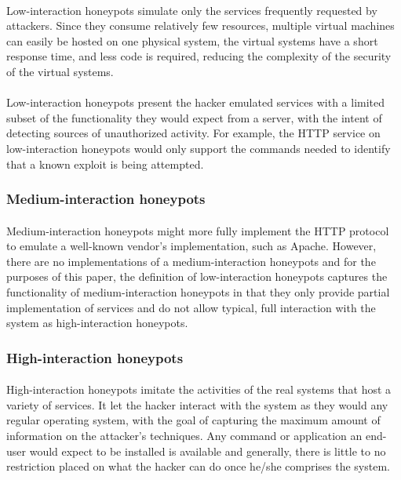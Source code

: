 \documentclass{article}
\begin{document}
\paragraph{}
Low-interaction honeypots simulate only the services frequently requested by attackers. Since they consume relatively few resources, multiple virtual machines can easily be hosted on one physical system, the virtual systems have a short response time, and less code is required, reducing the complexity of the security of the virtual systems.
\paragraph{}
Low-interaction honeypots present the hacker emulated services with a limited subset of the functionality they would expect from a server, with the intent of detecting sources of unauthorized activity. For example, the HTTP service on low-interaction honeypots would only support the commands needed to identify that a known exploit is being attempted.

\subsubsection{Medium-interaction honeypots}
\paragraph{}
Medium-interaction honeypots  might more fully implement the HTTP protocol to emulate a well-known vendor’s implementation, such as Apache. However, there are no implementations of a medium-interaction honeypots and for the purposes of this paper, the definition of low-interaction honeypots captures the functionality of medium-interaction honeypots in that they only provide partial implementation of services and do not allow typical, full interaction with the system as high-interaction honeypots.

\subsubsection{High-interaction honeypots}
\paragraph{}
High-interaction honeypots imitate the activities of the real systems that host a variety of services. It let the hacker interact with the system as they would any regular operating system, with the goal of capturing the maximum amount of information on the attacker’s techniques. Any command or application an end-user would expect to be installed is available and generally, there is little to no restriction placed on what the hacker can do once he/she comprises the system.
\end{document}
